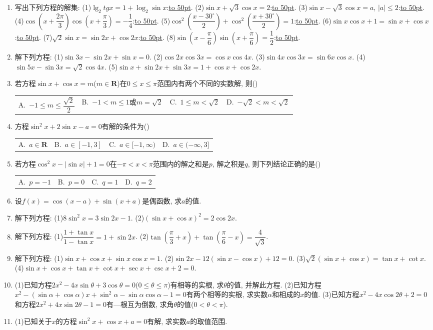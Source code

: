 \documentclass[10pt,a4paper]{article}
\newcommand{\blank}[1]{\underline{\hbox to #1pt{}}}
\newcommand{\fourch}[4]{\par\begin{tabular}{p{.23\textwidth}p{.23\textwidth}p{.23\textwidth}p{.23\textwidth}}
A.~#1 &B.~#2& C.~#3& D.~#4
\end{tabular}}
\begin{document}
\begin{enumerate}[1.]
\fourch{$\sin 2x=2\sin ^2x$}{$\cos x=\sqrt {1-\cos ^2x}$}{$\sin ^2x=\cos ^2x$}{$\dfrac{\cos 2x}{\sin x+\cos x}=0$}
\item 写出下列方程的解集:
(1)$\lg _2tgx=1+\log _2\sin x$:\blank{50}.
(2)$\sin x+\sqrt 3\cos x=2$:\blank{50}.
(3)$\sin x-\sqrt 3\cos x=a$, $|a|\le 2$:\blank{50}.
(4)$\cos (x+\dfrac{2\pi }3)\cos (x+\dfrac{\pi }3)=-\dfrac 14$:\blank{50}.
(5)$\cos ^2(\dfrac{x-30^\circ }2)+\cos ^2(\dfrac{x+30^\circ }2)=1$:\blank{50}.
(6)$\sin x\cos x+1=\sin x+\cos x$:\blank{50}.
(7)$\sqrt 2\sin x=\sin 2x+\cos 2x$:\blank{50}.
(8)$\sin (x-\dfrac{\pi }6)\sin (x+\dfrac{\pi }6)=\dfrac 12$:\blank{50}.
\item 解下列方程:
(1)$\sin 3x-\sin 2x+\sin x=0$.			(2)$\cos 2x\cos 3x=\cos x\cos 4x$.
(3)$\sin 4x\cos 3x=\sin 6x\cos x$.			(4)$\sin 5x-\sin 3x=\sqrt 2\cos 4x$.
(5)$\sin x+\sin 2x+\sin 3x=1+\cos x+\cos 2x$.
\item 若方程$\sin x+\cos x=m$($m\in \mathbf{R}$)在$0\le x\le \pi$范围内有两个不同的实数解, 则()
\fourch{$-1\le m\le \dfrac{\sqrt 2}2$}{$-1<m\le 1$或$m=\sqrt 2$}{$1\le m<\sqrt 2$}{$-\sqrt 2<m<\sqrt 2$}
\item 方程$\sin ^2x+2\sin x-a=0$有解的条件为()
\fourch{$a\in \mathbf{R}$}{$a\in [-1,3]$}{$a\in [-1,\infty)$}{$a\in (-\infty ,3]$}
\item 若方程$\cos ^2x-|\sin x|+1=0$在$-\pi <x<\pi$范围内的解之和是$p$, 解之积是$q$, 则下列结论正确的是()
\fourch{$p=-1$}{$p=0$}{$q=1$}{$q=2$}
\item 设$f(x)=\cos (x-a)+\sin (x+a)$是偶函数, 求$a$的值.
\item 解下列方程:
(1)$8\sin ^2x=3\sin 2x-1$.				(2)$(\sin x+\cos x)^2=2\cos 2x$.
\item 解下列方程:
(1)$\dfrac{1+\tan x}{1-\tan x}=1+\sin 2x$.				(2)$\tan (\dfrac{\pi }3+x)+\tan (\dfrac{\pi }6-x)=\dfrac 4{\sqrt 3}$.
\item 解下列方程:
(1)$\sin x+\cos x+\sin x\cos x=1$.
(2)$\sin 2x-12(\sin x-\cos x)+12=0$.
(3)$\sqrt 2(\sin x+\cos x)=\tan x+\cot x$.
(4)$\sin x+\cos x+\tan x+\cot x+\sec x+\csc x+2=0$.
\item (1)已知方程$2x^2-4x\sin \theta +3\cos \theta =0$($0\le \theta \le \pi$)有相等的实根, 求$\theta$的值, 并解此方程.
(2)已知方程$x^2-(\sin \alpha +\cos \alpha)x+\sin ^2\alpha -\sin \alpha \cos \alpha -1=0$有两个相等的实根, 求实数$\alpha$和相成的$x$的值.
(3)已知方程$x^2-4x\cos 2\theta +2=0$和方程$2x^2+4x\sin 2\theta -1=0$有—根互为倒数, 求角$\theta$的值($0<\theta <\pi$).
\item (1)已知关于$x$的方程$\sin ^2x+\cos x+a=0$有解, 求实数$a$的取值范围.

\end{enumerate}
\end{document}
